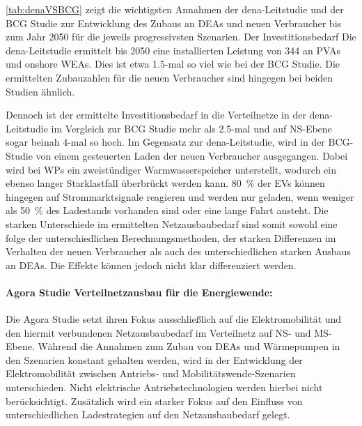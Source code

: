 

\autoref{tab:denaVSBCG} zeigt die wichtigsten Annahmen der dena-Leitstudie und der BCG Studie zur Entwicklung des Zubaus an \glspl{DEA} und neuen Verbraucher bis zum Jahr \num{2050} für die jeweils progressivsten Szenarien.
Der Investitionsbedarf Die dena-Leitstudie ermittelt bis \num{2050} eine installierten Leistung von \SI{344}{\gw} an \glspl{PVA} und onshore \glspl{WEA}.
Dies ist etwa  \num{1.5}-mal so viel wie bei der BCG Studie.
Die ermittelten Zubauzahlen für die neuen Verbraucher sind hingegen bei beiden Studien ähnlich.\medskip

Dennoch ist der ermittelte Investitionsbedarf in die Verteilnetze in der dena-Leitstudie im Vergleich zur BCG Studie mehr als \num{2.5}-mal und auf \gls{NS}-Ebene sogar beinah \num{4}-mal so hoch.
Im Gegensatz zur dena-Leitstudie, wird in der BCG-Studie von einem gesteuerten Laden der neuen Verbraucher ausgegangen.
Dabei wird bei \glspl{WP} ein zweistündiger Warmwasserspeicher unterstellt, wodurch ein ebenso langer Starklastfall überbrückt werden kann.
\SI{80}{\percent} der \glspl{EV} können hingegen auf Strommarktsignale reagieren und werden nur geladen, wenn weniger als \SI{50}{\percent} des Ladestands vorhanden sind oder eine lange Fahrt ansteht.
Die starken Unterschiede im ermittelten Netzausbaubedarf sind somit sowohl eine folge der unterschiedlichen Berechnungsmethoden, der starken Differenzen im Verhalten der neuen Verbraucher als auch des unterschiedlichen starken Ausbaus an \glspl{DEA}.
Die Effekte können jedoch nicht klar differenziert werden.

\paragraph{Agora Studie \glqq Verteilnetzausbau für die Energiewende\grqq{}:}

Die Agora Studie setzt ihren Fokus ausschließlich auf die Elektromobilität und den hiermit verbundenen Netzausbaubedarf im Verteilnetz auf \gls{NS}- und \gls{MS}-Ebene.
Während die Annahmen zum Zubau von \glspl{DEA} und Wärmepumpen in den Szenarien konstant gehalten werden, wird in der Entwicklung der Elektromobilität zwischen \glqq Antriebs-\grqq{} und \glqq Mobilitätswende\grqq-Szenarien unterschieden.
Nicht elektrische Antriebstechnologien werden hierbei nicht berücksichtigt.
Zusätzlich wird ein starker Fokus auf den Einfluss von unterschiedlichen Ladestrategien auf den Netzausbaubedarf gelegt.\medskip

